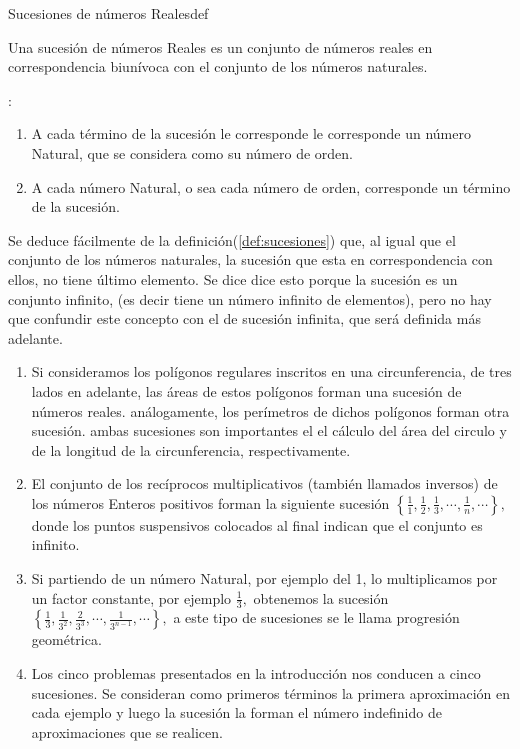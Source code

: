 \vspace*{10pt}\begin{defi}{Sucesiones de números Reales}{def}\label{def:sucesiones}

Una sucesión de números Reales es un conjunto de números reales en
correspondencia biunívoca con el conjunto de los números naturales.

\end{defi}

:
\begin{enumerate}
\item A cada término de la sucesión le corresponde le corresponde un número
Natural, que se considera como su número de orden.
\item A cada número Natural, o sea cada número de orden, corresponde un
término de la sucesión.
\end{enumerate}
Se deduce fácilmente de la definición(\ref{def:sucesiones}) que,
al igual que el conjunto de los números naturales, la sucesión que
esta en correspondencia con ellos, no tiene último elemento. Se dice
dice esto porque la sucesión es un conjunto infinito, (es decir tiene
un número infinito de elementos), pero no hay que confundir este concepto
con el de sucesión infinita, que será definida más adelante.

\begin{ejemplos}
\begin{enumerate}
\item Si consideramos los polígonos regulares inscritos en una circunferencia,
de tres lados en adelante, las áreas de estos polígonos forman una
sucesión de números reales. análogamente, los perímetros de dichos
polígonos forman otra sucesión. ambas sucesiones son importantes el
el cálculo del área del circulo y de la longitud de la circunferencia,
respectivamente.
\item El conjunto de los recíprocos multiplicativos (también llamados inversos)
de los números Enteros positivos forman la siguiente sucesión $\left\{ \frac{1}{1},\frac{1}{2},\frac{1}{3},\cdots,\frac{1}{n},\cdots\right\} ,$
donde los puntos suspensivos colocados al final indican que el conjunto
es infinito.
\item Si partiendo de un número Natural, por ejemplo del 1, lo multiplicamos
por un factor constante, por ejemplo $\frac{1}{3},$ obtenemos la
sucesión $\left\{ \frac{1}{3},\frac{1}{3^{2}},\frac{2}{3^{3}},\cdots,\frac{1}{3^{n-1}},\cdots\right\} ,$
a este tipo de sucesiones se le llama progresión geométrica.
\item Los cinco problemas presentados en la introducción nos conducen a
cinco sucesiones. Se consideran como primeros términos la primera
aproximación en cada ejemplo y luego la sucesión la forman el número
indefinido de aproximaciones que se realicen.
\end{enumerate}
\end{ejemplos}

